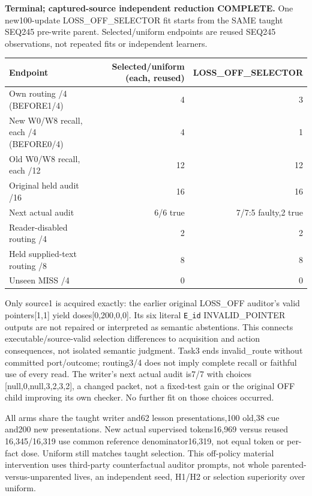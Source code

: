 \documentclass{article}
\begin{document}
\textbf{Terminal; captured-source independent reduction COMPLETE.}
One new100-update LOSS\_OFF\_SELECTOR fit starts from the SAME taught SEQ245
pre-write parent. Selected/uniform endpoints are reused SEQ245 observations,
not repeated fits or independent learners.

\begin{center}
\small
\begin{tabular}{lrr}
\toprule
Endpoint & Selected/uniform (each, reused) & LOSS\_OFF\_SELECTOR \\
\midrule
Own routing /4 (BEFORE1/4) & 4 & 3 \\
New W0/W8 recall, each /4 (BEFORE0/4) & 4 & 1 \\
Old W0/W8 recall, each /12 & 12 & 12 \\
Original held audit /16 & 16 & 16 \\
Next actual audit & 6/6 true & 7/7:5 faulty,2 true \\
Reader-disabled routing /4 & 2 & 2 \\
Held supplied-text routing /8 & 8 & 8 \\
Unseen MISS /4 & 0 & 0 \\
\bottomrule
\end{tabular}
\end{center}

Only source1 is acquired exactly: the earlier original LOSS\_OFF auditor's
valid pointers[1,1] yield doses[0,200,0,0]. Its six literal \texttt{E\_id}
INVALID\_POINTER outputs are not repaired or interpreted as semantic abstentions.
This connects executable/source-valid selection differences to acquisition and
action consequences, not isolated semantic judgment. Task3 ends invalid\_route
without committed port/outcome; routing3/4 does not imply complete recall or
faithful use of every read. The writer's next actual audit is7/7 with choices
[null,0,null,3,2,3,2], a changed packet, not a fixed-test gain or the original
OFF child improving its own checker. No further fit on those choices occurred.

All arms share the taught writer and62 lesson presentations,100 old,38 cue
and200 new presentations. New actual supervised tokens16,969 versus reused
16,345/16,319 use common reference denominator16,319, not equal token or per-fact
dose. Uniform still matches taught selection. This off-policy material
intervention uses third-party counterfactual auditor prompts, not whole
parented-versus-unparented lives, an independent seed, H1/H2 or selection
superiority over uniform.
\end{document}

